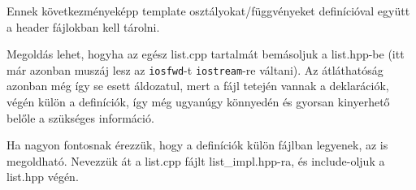 \documentclass[a4paper,11.5pt,table]{article}
\begin{document}
	Ennek következményeképp template osztályokat/függvényeket definícióval együtt a header fájlokban kell tárolni.
	
	Megoldás lehet, hogyha az egész list.cpp tartalmát bemásoljuk a list.hpp-be (itt már azonban muszáj lesz az \texttt{iosfwd}-t \texttt{iostream}-re váltani). Az átláthatóság azonban még így se esett áldozatul, mert a fájl tetején vannak a deklarációk, végén külön a definíciók, így még ugyanúgy könnyedén és gyorsan kinyerhető belőle a szükséges információ.
	
	\begin{note}
		Ha nagyon fontosnak érezzük, hogy a definíciók külön fájlban legyenek, az is megoldható. Nevezzük át a {list.cpp} fájlt {list\_impl.hpp}-ra, és include-oljuk a {list.hpp} végén.
	\end{note}
	
\end{document}
